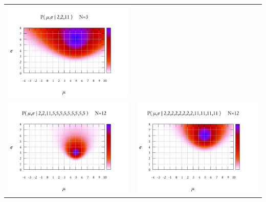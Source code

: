\begin{tabular}{ll}
	\includegraphics{bayes4.png}\\
	\includegraphics{bayes5.png}&
	\includegraphics{bayes6.png}\\
\end{tabular}
